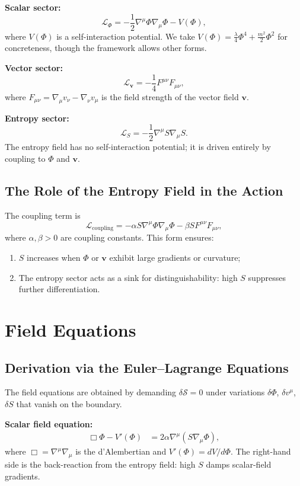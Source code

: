 \documentclass[12pt,a4paper,twoside,openright]{book}
\theoremstyle{plain}
\theoremstyle{definition}
\theoremstyle{remark}
\newcommand{\vfield}{\bm{v}}
\newcommand{\Sfield}{S}
\newcommand{\Phifield}{\Phi}
\begin{document}
\textbf{Scalar sector:}
\[
\mathcal{L}_\Phifield = -\frac{1}{2} \nabla^\mu \Phifield \nabla_\mu \Phifield - V(\Phifield),
\]
where $V(\Phifield)$ is a self-interaction potential. We take $V(\Phifield) = \frac{\lambda}{4}\Phifield^4 + \frac{m^2}{2}\Phifield^2$ for concreteness, though the framework allows other forms.

\textbf{Vector sector:}
\[
\mathcal{L}_\vfield = -\frac{1}{4} F^{\mu\nu} F_{\mu\nu},
\]
where $F_{\mu\nu} = \nabla_\mu v_\nu - \nabla_\nu v_\mu$ is the field strength of the vector field $\vfield$.

\textbf{Entropy sector:}
\[
\mathcal{L}_\Sfield = -\frac{1}{2} \nabla^\mu \Sfield \nabla_\mu \Sfield.
\]
The entropy field has no self-interaction potential; it is driven entirely by coupling to $\Phifield$ and $\vfield$.

\subsection{The Role of the Entropy Field in the Action}

The coupling term is
\[
\mathcal{L}_{\mathrm{coupling}} = -\alpha \Sfield \nabla^\mu \Phifield \nabla_\mu \Phifield - \beta \Sfield F^{\mu\nu}F_{\mu\nu},
\]
where $\alpha, \beta > 0$ are coupling constants. This form ensures:
\begin{enumerate}
\item $\Sfield$ increases when $\Phifield$ or $\vfield$ exhibit large gradients or curvature;
\item The entropy sector acts as a sink for distinguishability: high $\Sfield$ suppresses further differentiation.
\end{enumerate}

\section{Field Equations}

\subsection{Derivation via the Euler--Lagrange Equations}

The field equations are obtained by demanding $\delta \mathcal{S} = 0$ under variations $\delta\Phifield$, $\delta v^\mu$, $\delta\Sfield$ that vanish on the boundary.

\textbf{Scalar field equation:}
\begin{align}
\Box \Phifield - V'(\Phifield) &= 2\alpha \nabla^\mu(\Sfield \nabla_\mu \Phifield), \label{eq:phi-eom}
\end{align}
where $\Box = \nabla^\mu \nabla_\mu$ is the d'Alembertian and $V'(\Phifield) = dV/d\Phifield$. The right-hand side is the back-reaction from the entropy field: high $\Sfield$ damps scalar-field gradients.
\end{document}
